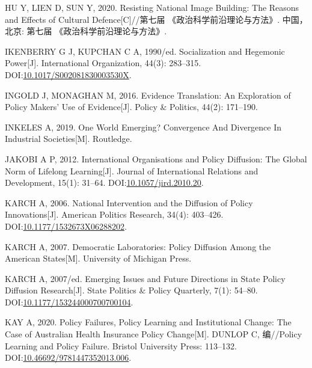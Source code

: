 \documentclass[
  12pt,
]{ctexart}
\newlength{\cslhangindent}
\newlength{\cslentryspacingunit} %
\newenvironment{CSLReferences}[2] %
 {%
  \setlength{\parindent}{0pt}
  \ifodd #1
  \let\oldpar\par
  \def\par{\hangindent=\cslhangindent\oldpar}
  \fi
  \setlength{\parskip}{#2\cslentryspacingunit}
 }%
 {}
\begin{document}
\begin{CSLReferences}{1}{0}
\leavevmode{}%
HU Y, LIEN D, SUN Y, 2020. Resisting {National Image Building}: {The Reasons} and {Effects} of {Cultural Defence}{[}C{]}//第七届 {《政治科学前沿理论与方法》}. {中国，北京}: {第七届 {《政治科学前沿理论与方法》}}.

\leavevmode{}%
IKENBERRY G J, KUPCHAN C A, 1990/ed. Socialization and Hegemonic Power{[}J{]}. International Organization, 44(3): 283--315. DOI:\href{https://doi.org/10.1017/S002081830003530X}{10.1017/S002081830003530X}.

\leavevmode{}%
INGOLD J, MONAGHAN M, 2016. Evidence Translation: An Exploration of Policy Makers' Use of Evidence{[}J{]}. Policy \& Politics, 44(2): 171--190.

\leavevmode{}%
INKELES A, 2019. One {World Emerging}? {Convergence And Divergence In Industrial Societies}{[}M{]}. {Routledge}.

\leavevmode{}%
JAKOBI A P, 2012. International Organisations and Policy Diffusion: The Global Norm of Lifelong Learning{[}J{]}. Journal of International Relations and Development, 15(1): 31--64. DOI:\href{https://doi.org/10.1057/jird.2010.20}{10.1057/jird.2010.20}.

\leavevmode{}%
KARCH A, 2006. National {Intervention} and the {Diffusion} of {Policy Innovations}{[}J{]}. American Politics Research, 34(4): 403--426. DOI:\href{https://doi.org/10.1177/1532673X06288202}{10.1177/1532673X06288202}.

\leavevmode{}%
KARCH A, 2007. Democratic {Laboratories}: {Policy Diffusion Among} the {American States}{[}M{]}. {University of Michigan Press}.

\leavevmode{}%
KARCH A, 2007/ed. Emerging {Issues} and {Future Directions} in {State Policy Diffusion Research}{[}J{]}. State Politics \& Policy Quarterly, 7(1): 54--80. DOI:\href{https://doi.org/10.1177/153244000700700104}{10.1177/153244000700700104}.

\leavevmode{}%
KAY A, 2020. Policy {Failures}, {Policy Learning} and {Institutional Change}: {The Case} of {Australian Health Insurance Policy Change}{[}M{]}. DUNLOP C, 编//Policy {Learning} and {Policy Failure}. {Bristol University Press}: 113--132. DOI:\href{https://doi.org/10.46692/9781447352013.006}{10.46692/9781447352013.006}.


\end{CSLReferences}
\end{document}
